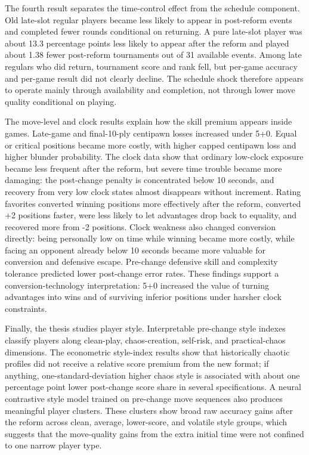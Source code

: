 The fourth result separates the time-control effect from the schedule component. Old late-slot regular players became less likely to appear in post-reform events and completed fewer rounds conditional on returning. A pure late-slot player was about 13.3 percentage points less likely to appear after the reform and played about 1.38 fewer post-reform tournaments out of 31 available events. Among late regulars who did return, tournament score and rank fell, but per-game accuracy and per-game result did not clearly decline. The schedule shock therefore appears to operate mainly through availability and completion, not through lower move quality conditional on playing.

The move-level and clock results explain how the skill premium appears inside games. Late-game and final-10-ply centipawn losses increased under 5+0. Equal or critical positions became more costly, with higher capped centipawn loss and higher blunder probability. The clock data show that ordinary low-clock exposure became less frequent after the reform, but severe time trouble became more damaging: the post-change penalty is concentrated below 10 seconds, and recovery from very low clock states almost disappears without increment. Rating favorites converted winning positions more effectively after the reform, converted +2 positions faster, were less likely to let advantages drop back to equality, and recovered more from -2 positions. Clock weakness also changed conversion directly: being personally low on time while winning became more costly, while facing an opponent already below 10 seconds became more valuable for conversion and defensive escape. Pre-change defensive skill and complexity tolerance predicted lower post-change error rates. These findings support a conversion-technology interpretation: 5+0 increased the value of turning advantages into wins and of surviving inferior positions under harsher clock constraints.

Finally, the thesis studies player style. Interpretable pre-change style indexes classify players along clean-play, chaos-creation, self-risk, and practical-chaos dimensions. The econometric style-index results show that historically chaotic profiles did not receive a relative score premium from the new format; if anything, one-standard-deviation higher chaos style is associated with about one percentage point lower post-change score share in several specifications. A neural contrastive style model trained on pre-change move sequences also produces meaningful player clusters. These clusters show broad raw accuracy gains after the reform across clean, average, lower-score, and volatile style groups, which suggests that the move-quality gains from the extra initial time were not confined to one narrow player type.

